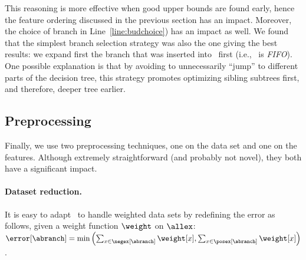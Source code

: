 \documentclass{article}
\begin{document}

This reasoning is more effective when good upper bounds are found early, hence the feature ordering  discussed in the previous section has an impact. Moreover, the choice of branch in Line~\ref{line:budchoice}) has an impact as well. We found that the simplest branch selection strategy was also the one giving the best results: we expand first the branch that was inserted into \bud\ first (i.e., \bud\ is \emph{FIFO}). One possible explanation is that by avoiding to unnecessarily ``jump'' to different parts of the decision tree, this strategy promotes optimizing sibling subtrees first, and therefore, deeper tree earlier.





















\subsection{Preprocessing}
\label{sec:preprocessing}

Finally, we use two preprocessing techniques, one on the data set and one on the features. Although extremely straightforward (and probably not novel), they both have a significant impact.

\paragraph{Dataset reduction.}
It is easy to adapt \blossom\ to handle weighted data sets by redefining the error as follows, given a weight function $\weight$ on $\allex$:
$
\error[\abranch] = \min\left( \sum_{x \in \negex[\abranch]}\weight[x], \sum_{x \in \posex[\abranch]}\weight[x] \right)
$.
\end{document}
